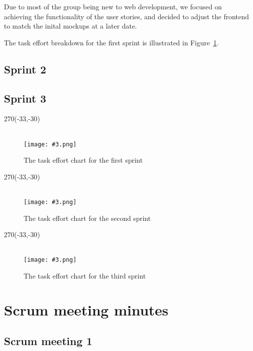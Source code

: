 \documentclass[a4paper,titlepage,12pt]{article}
\let\stdsection\section
\renewcommand\section{\newpage\stdsection}
\newcommand\figimg[4][\textwidth]{
	\begin{figure}
		\caption{#4}
		\label{fig:#2}
		\quad\\\texttt{[image: \#3.png]}
	\end{figure}
}
\begin{document}
Due to most of the group being new to web development, we focused on achieving
the functionality of the user stories, and decided to adjust the frontend to
match the inital mockups at a later date.

The task effort breakdown for the first sprint is illustrated in
Figure~\ref{fig:effort1}.

\newpage

\subsection{Sprint 2}

\newpage

\subsection{Sprint 3}

\begin{landscape}
	\quad %
	\thispagestyle{empty}
	\begin{textblock}{270}(-33,-30)
		\figimg[280mm]{effort1}{effort1}
			{The task effort chart for the first sprint}
	\end{textblock}
\end{landscape}

\begin{landscape}
	\quad %
	\thispagestyle{empty}
	\begin{textblock}{270}(-33,-30)
		\figimg[280mm]{effort2}{effort2}
			{The task effort chart for the second sprint}
	\end{textblock}
\end{landscape}

\begin{landscape}
	\quad %
	\thispagestyle{empty}
	\begin{textblock}{270}(-33,-30)
		\figimg[280mm]{effort3}{effort3}
			{The task effort chart for the third sprint}
	\end{textblock}
\end{landscape}

\section{Scrum meeting minutes}

\subsection{Scrum meeting 1}
\end{document}

